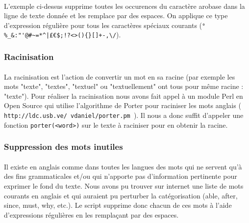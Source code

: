\paragraph{}
L'exemple ci-dessus supprime toutes les occurences du caractère arobase dans la ligne de texte donnée et les remplace par des espaces. On applique ce type d'expression régulière pour tous les caractères spéciaux courants (\verb.°%_&:"'@#~=*^|£€$;!?<>(){}[]+-,\/.).

\subsubsection{Racinisation}
\paragraph{}
La racinisation est l'action de convertir un mot en sa racine (par exemple les mots "texte", "textes", "textuel" ou "textuellement" ont tous pour même racine : "texte"). Pour réaliser la racinisation nous avons fait appel à un module Perl en Open Source qui utilise l'algorithme de Porter pour raciniser les mots anglais (\texttt{ http://ldc.usb.ve/~vdaniel/porter.pm }). Il nous a donc suffit d'appeler une fonction \texttt{porter(<word>)} sur le texte à raciniser pour en obtenir la racine.

\subsubsection{Suppression des mots inutiles}
\paragraph{}
Il existe en anglais comme dans toutes les langues des mots qui ne servent qu'à des fins grammaticales et/ou qui n'apporte pas d'information pertinente pour exprimer le fond du texte. Nous avons pu trouver sur internet une liste de mots courants en anglais et qui auraient pu perturber la catégorisation (able, after, since, must, why, etc.). Le script supprime donc chacun de ces mots à l'aide d'expressions régulières en les remplaçant par des espaces.